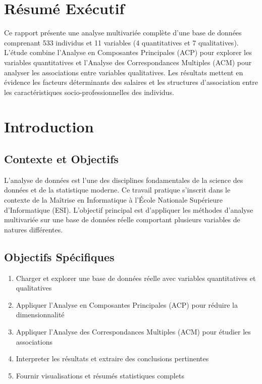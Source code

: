 \documentclass[12pt,a4paper]{report}
\begin{document}
\newpage

\section*{Résumé Exécutif}

Ce rapport présente une analyse multivariée complète d'une base de données comprenant 533 individus et 11 variables (4 quantitatives et 7 qualitatives). L'étude combine l'Analyse en Composantes Principales (ACP) pour explorer les variables quantitatives et l'Analyse des Correspondances Multiples (ACM) pour analyser les associations entre variables qualitatives. Les résultats mettent en évidence les facteurs déterminants des salaires et les structures d'association entre les caractéristiques socio-professionnelles des individus.

\tableofcontents

\newpage

\section{Introduction}

\subsection{Contexte et Objectifs}

L'analyse de données est l'une des disciplines fondamentales de la science des données et de la statistique moderne. Ce travail pratique s'inscrit dans le contexte de la Maîtrise en Informatique à l'École Nationale Supérieure d'Informatique (ESI). L'objectif principal est d'appliquer les méthodes d'analyse multivariée sur une base de données réelle comportant plusieurs variables de natures différentes.

\subsection{Objectifs Spécifiques}

\begin{enumerate}
    \item Charger et explorer une base de données réelle avec variables quantitatives et qualitatives
    \item Appliquer l'Analyse en Composantes Principales (ACP) pour réduire la dimensionnalité
    \item Appliquer l'Analyse des Correspondances Multiples (ACM) pour étudier les associations
    \item Interpreter les résultats et extraire des conclusions pertinentes
    \item Fournir visualisations et résumés statistiques complets
\end{enumerate}
\end{document}
